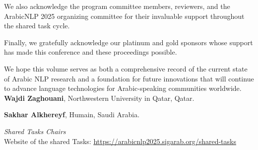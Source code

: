 We also acknowledge the program committee members, reviewers, and the ArabicNLP 2025 organizing committee for their invaluable support throughout the shared task cycle.

Finally, we gratefully acknowledge our platinum and gold sponsors whose support has made this conference and these proceedings possible.

We hope this volume serves as both a comprehensive record of the current state of Arabic NLP research and a foundation for future innovations that will continue to advance language technologies for Arabic-speaking communities worldwide.
\\


\textbf{Wajdi Zaghouani}, Northwestern University in Qatar, Qatar.

\textbf{Sakhar Alkhereyf}, Humain, Saudi Arabia.

\textit{Shared Tasks Chairs}
\\

Website of the shared Tasks: \href{https://arabicnlp2025.sigarab.org/shared-tasks}{https://arabicnlp2025.sigarab.org/shared-tasks}
